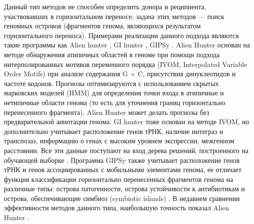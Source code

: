 Данный тип методов не способен определить донора и реципиента, участвовавших в горизонтальном переносе, задача этих методов --- поиск геномных островов (фрагментов генома, являющихся результатом горизонтального переноса). Примерами реализации данного подхода являются такие программы как Alien hunter \cite{vernikos2006interpolated}, GI hunter \cite{che2014accurate}, GIPSy \cite{soares2016gipsy}. Alien Hunter основан на методе обнаружения атипичных областей в геноме при помощи подхода интерполированных мотивов переменного порядка (IVOM, Interpolated Variable Order Motifs) при анализе содержания G + C, присутствия динуклеотидов и частоте кодонов. Прогнозы оптимизируются с использованием скрытых марковских моделей (HMM) для определения точки входа в атипичные и нетипичные области генома (то есть для уточнения границ горизонтально перенесенного фрагмента). Alien Hunter может делать прогнозы без предварительной аннотации генома. GI hunter тоже основан на методе IVOM, но дополнительно учитывает расположение генов тРНК, наличие интеграз и транспозаз, информацию о генах с высоким уровнем экспрессии, межгенном расстоянии. Все эти данные поступают на вход дерева решений, построенного на обучающей выборке \cite{che2014accurate}. Программа GIPSy также учитывает расположение генов тРНК и генов ассоциированных с мобильными элементами генома, ее отличает функция классификации горизонтально перенесенных фрагментов генома на различные типы: острова патогенности, острова устойчивости к антибиотикам и острова, обеспечивающие симбиоз (symbiotic islands) \cite{soares2016gipsy}. В недавнем сравнении эффективности методов данного типа, наибольшую точность показал Alien Hunter \cite{da2018comparative}.

